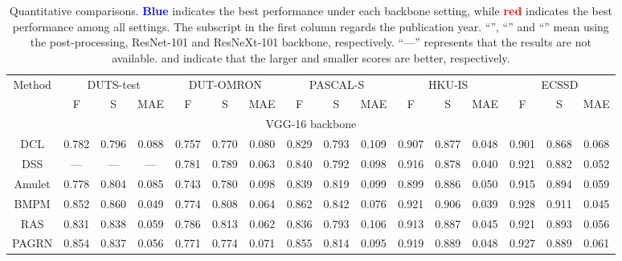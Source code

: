 \documentclass[runningheads]{llncs}
\newcommand{\textBC}[2]{\textbf{\textcolor{#1}{#2}}}
\begin{document}
	\begin{table*}
		\caption{
			Quantitative comparisons. \textBC{blue}{Blue} indicates the best performance under each backbone setting, while \textBC{red}{red} indicates the best performance among all settings. The subscript in the first column regards the publication year. ``'', ``'' and ``'' mean using the post-processing, ResNet-101 and ResNeXt-101 backbone, respectively. ``---'' represents that the results are not available.  and  indicate that the larger and smaller scores are better, respectively.
		}
		\label{tab:scores}
		\renewcommand\tabcolsep{4.0pt} \renewcommand\arraystretch{1.2}
		\scriptsize
		\centering
		\scalebox{.72}
		{
			\begin{tabular}{cccccccccccccccc}
				
				\toprule[2pt]
				\multirow{2}{*}{Method}  &\multicolumn{3}{c}{DUTS-test}&\multicolumn{3}{c}{DUT-OMRON}&\multicolumn{3}{c}{PASCAL-S}&\multicolumn{3}{c}{HKU-IS}&\multicolumn{3}{c}{ECSSD}\\
				\cmidrule(r){2-4} \cmidrule(r){5-7} \cmidrule(r){8-10} \cmidrule(r){11-13} \cmidrule(r){14-16}
				&F & S & MAE & F & S & MAE &F & S & MAE & F & S & MAE &F & S & MAE \\
				\midrule[1pt]
				\multicolumn{16}{c}{VGG-16 backbone} \\
				\midrule[1pt]
				
				DCL    & 0.782  & 0.796 & 0.088   & 0.757  & 0.770  & 0.080   & 0.829  & 0.793  & 0.109   & 0.907  & 0.877 & 0.048   & 0.901  & 0.868  & 0.068  \\
				
				
				DSS     &  ---  &  --- & ---   & 0.781  & 0.789  & 0.063   & 0.840  & 0.792  & 0.098   & 0.916  & 0.878 & 0.040   & 0.921  & 0.882  & 0.052  \\
				
				
				Amulet      & 0.778  & 0.804 & 0.085   & 0.743  & 0.780  & 0.098   & 0.839  & 0.819  & 0.099   & 0.899  & 0.886 & 0.050   & 0.915  & 0.894  & 0.059  \\
				
				BMPM & 0.852 & 0.860 & 0.049 & 0.774 & 0.808 & 0.064 & 0.862 & 0.842  & 0.076 & 0.921 & 0.906 & 0.039 
				& 0.928 & 0.911  & 0.045 \\
				RAS     & 0.831  & 0.838 & 0.059   & 0.786  & 0.813  & 0.062  & 0.836 &0.793 &0.106 & 0.913  & 0.887  & 0.045  & 0.921  & 0.893  & 0.056    \\
				
				
				PAGRN  & 0.854 & 0.837  & 0.056  & 0.771 & 0.774  & 0.071 & 0.855 & 0.814 & 0.095 & 0.919 & 0.889 & 0.048 & 0.927 & 0.889 & 0.061 \\
	

\end{tabular}}
\end{table*}
\end{document}
